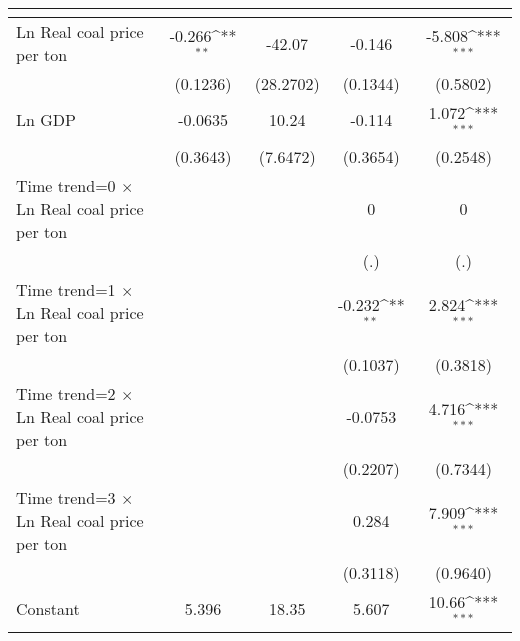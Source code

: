 {
\def\sym#1{\ifmmode^{#1}\else\(^{#1}\)\fi}
\begin{tabular}{l*{4}{c}}
\toprule
                    &&&&\\
\midrule
Ln Real coal price per ton&      -0.266\sym{**} &      -42.07         &      -0.146         &      -5.808\sym{***}\\
                    &    (0.1236)         &   (28.2702)         &    (0.1344)         &    (0.5802)         \\
\addlinespace
Ln GDP              &     -0.0635         &       10.24         &      -0.114         &       1.072\sym{***}\\
                    &    (0.3643)         &    (7.6472)         &    (0.3654)         &    (0.2548)         \\
\addlinespace
Time trend=0 $\times$ Ln Real coal price per ton&                     &                     &           0         &           0         \\
                    &                     &                     &         (.)         &         (.)         \\
\addlinespace
Time trend=1 $\times$ Ln Real coal price per ton&                     &                     &      -0.232\sym{**} &       2.824\sym{***}\\
                    &                     &                     &    (0.1037)         &    (0.3818)         \\
\addlinespace
Time trend=2 $\times$ Ln Real coal price per ton&                     &                     &     -0.0753         &       4.716\sym{***}\\
                    &                     &                     &    (0.2207)         &    (0.7344)         \\
\addlinespace
Time trend=3 $\times$ Ln Real coal price per ton&                     &                     &       0.284         &       7.909\sym{***}\\
                    &                     &                     &    (0.3118)         &    (0.9640)         \\
\addlinespace
Constant            &       5.396         &       18.35         &       5.607         &       10.66\sym{***}\\

\end{tabular}}
